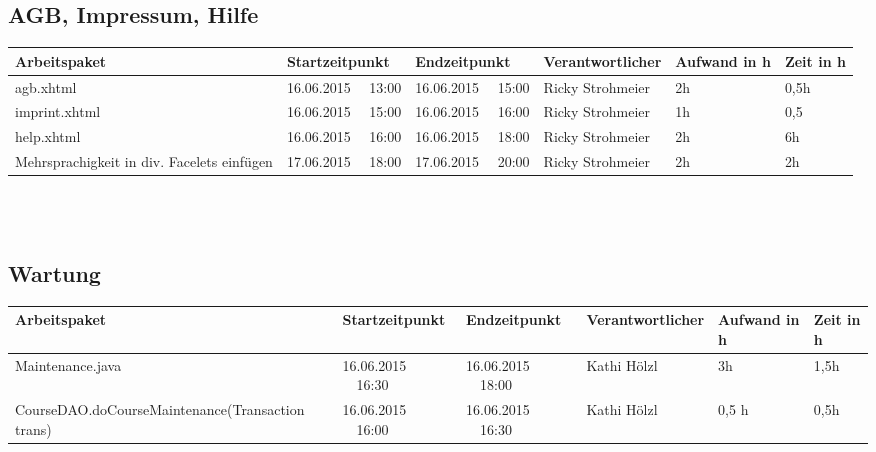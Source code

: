 \begin{landscape}
	\subsection{AGB, Impressum, Hilfe}
	\begin{tabular}{|p{10.3cm}|p{3.2cm}|p{3.2cm}|p{3.5cm}|p{1.7cm}|p{1.5cm}|}
		\hline  \textbf{Arbeitspaket} & \textbf{Startzeitpunkt} & \textbf{Endzeitpunkt} & \textbf{Verantwortlicher}  & \textbf{Aufwand in h} & \textbf{Zeit in h}\\
		\hline   agb.xhtml          & 16.06.2015 \ \ 13:00        & 16.06.2015 \ \ 15:00        & Ricky Strohmeier &  2h                 & 0,5h\\
		\hline   imprint.xhtml      & 16.06.2015 \ \ 15:00        & 16.06.2015 \ \ 16:00        & Ricky Strohmeier &  1h                 & 0,5\\
		\hline   help.xhtml         & 16.06.2015 \ \ 16:00        & 16.06.2015 \ \ 18:00        & Ricky Strohmeier &  2h                 & 6h\\
		\hline   Mehrsprachigkeit in div. Facelets einfügen         & 17.06.2015 \ \ 18:00        & 17.06.2015 \ \ 20:00        & Ricky Strohmeier &  2h                 & 2h\\
		\hline
	\end{tabular} \ \\
	\ \\	
	
	\subsection{Wartung}
	\begin{tabular}{|p{10.3cm}|p{3.2cm}|p{3.2cm}|p{3.5cm}|p{1.7cm}|p{1.5cm}|}
		\hline  \textbf{Arbeitspaket} & \textbf{Startzeitpunkt} & \textbf{Endzeitpunkt} & \textbf{Verantwortlicher}  & \textbf{Aufwand in h} & \textbf{Zeit in h}\\ 
		\hline   Maintenance.java         & 16.06.2015 \ \ 16:30       & 16.06.2015  \ \  18:00        & Kathi Hölzl &  3h  &  1,5h \\
		\hline   CourseDAO.doCourseMaintenance(Transaction trans)         & 16.06.2015 \ \ 16:00       & 16.06.2015  \ \  16:30        & Kathi Hölzl &  0,5 h  &  0,5h \\
		\hline
	\end{tabular}	
	

				
\end{landscape}